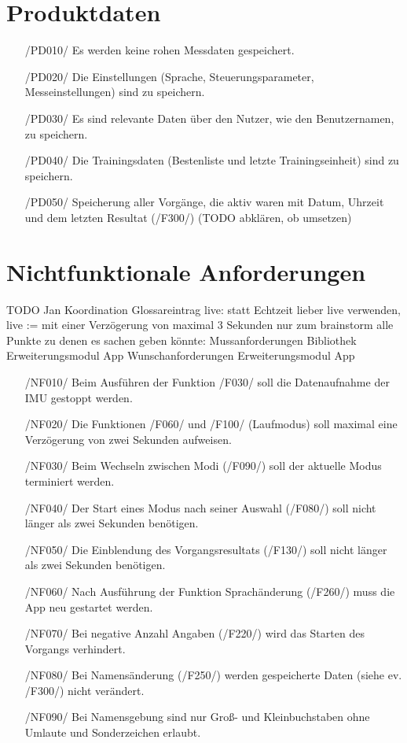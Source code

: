 \documentclass[a4paper,12pt]{article}
\begin{document}
\section{Produktdaten}
\begin{itemize}
	\item[/PD010/] Es werden keine rohen Messdaten gespeichert.
	\item[/PD020/] Die Einstellungen (Sprache, Steuerungsparameter, Messeinstellungen) sind zu speichern. 
	\item[/PD030/] Es sind relevante Daten über den Nutzer, wie den Benutzernamen, zu speichern.
	\item[/PD040/] Die Trainingsdaten (Bestenliste und letzte Trainingseinheit) sind zu speichern. %
	\item[/PD050/] Speicherung aller Vorgänge, die aktiv waren mit Datum, Uhrzeit und dem letzten Resultat (/F300/) (TODO abklären, ob umsetzen)
\end{itemize}


\section{Nichtfunktionale Anforderungen}
TODO Jan Koordination
Glossareintrag \glqq live\grqq{}: statt Echtzeit lieber \glqq live\grqq{} verwenden, live := mit einer Verzögerung von maximal 3 Sekunden
  nur zum brainstorm alle Punkte zu denen es sachen geben könnte:
  {Mussanforderungen}
      {Bibliothek}
      {Erweiterungsmodul}
      {App}
    {Wunschanforderungen}
      {Erweiterungsmodul}
      {App}
\begin{itemize}
  \item[/NF010/] Beim Ausführen der Funktion /F030/ soll die Datenaufnahme der IMU gestoppt werden.
  \item[/NF020/] Die Funktionen /F060/ und /F100/ (Laufmodus) soll maximal eine Verzögerung von zwei Sekunden aufweisen. %
  \item[/NF030/] Beim Wechseln zwischen Modi (/F090/) soll der aktuelle Modus terminiert werden.
  \item[/NF040/] Der Start eines Modus nach seiner Auswahl (/F080/) soll nicht länger als zwei Sekunden benötigen.
  \item[/NF050/] Die Einblendung des Vorgangsresultats (/F130/) soll nicht länger als zwei Sekunden benötigen.
  \item[/NF060/] Nach Ausführung der Funktion  Sprachänderung (/F260/) muss die App neu gestartet werden.
  \item[/NF070/] Bei negative Anzahl Angaben (/F220/) wird das Starten des Vorgangs verhindert.
  \item[/NF080/] Bei Namensänderung (/F250/) werden gespeicherte Daten (siehe ev. /F300/) nicht verändert.
  \item[/NF090/] Bei Namensgebung sind nur Groß- und Kleinbuchstaben ohne Umlaute und Sonderzeichen erlaubt.
\end{itemize}
\end{document}
